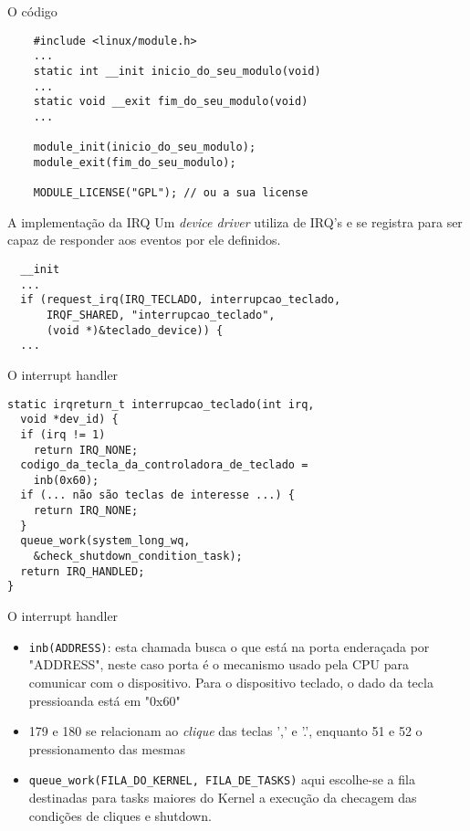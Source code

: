 \documentclass{beamer}
\begin{document}
\begin{frame}[fragile]{O código}
\begin{verbatim}
    #include <linux/module.h>
    ...
    static int __init inicio_do_seu_modulo(void) 
    ...
    static void __exit fim_do_seu_modulo(void)
    ...

    module_init(inicio_do_seu_modulo);
    module_exit(fim_do_seu_modulo);

    MODULE_LICENSE("GPL"); // ou a sua license
\end{verbatim}
\end{frame}

\begin{frame}[fragile]{A implementação da IRQ}
  Um \emph{device driver} utiliza de IRQ's e se registra para ser capaz de
  responder aos eventos por ele definidos.

\begin{verbatim}
  __init
  ...
  if (request_irq(IRQ_TECLADO, interrupcao_teclado, 
      IRQF_SHARED, "interrupcao_teclado", 
      (void *)&teclado_device)) {
  ...
\end{verbatim}
\end{frame}

\begin{frame}[fragile]{O interrupt handler}
\begin{verbatim}
static irqreturn_t interrupcao_teclado(int irq, 
  void *dev_id) {
  if (irq != 1)
    return IRQ_NONE;
  codigo_da_tecla_da_controladora_de_teclado = 
    inb(0x60);
  if (... não são teclas de interesse ...) {
    return IRQ_NONE;
  }
  queue_work(system_long_wq, 
    &check_shutdown_condition_task);
  return IRQ_HANDLED;
}
\end{verbatim}
\end{frame}

\begin{frame}{O interrupt handler}
  \begin{itemize}
    \item{\texttt{inb(ADDRESS)}: esta chamada busca o que está na porta
      enderaçada por "ADDRESS", neste caso porta é o mecanismo usado pela CPU
      para comunicar com o dispositivo. Para o dispositivo teclado, o dado da
      tecla pressioanda está em "0x60"}
    \item{179 e 180 se relacionam ao \emph{clique} das teclas ',' e '.',
      enquanto 51 e 52 o pressionamento das mesmas}
    \item{\texttt{queue\_work(FILA\_DO\_KERNEL, FILA\_DE\_TASKS)} aqui
      escolhe-se a fila destinadas para tasks maiores do Kernel a execução da
      checagem das condições de cliques e shutdown.}
  \end{itemize}
\end{frame}
\end{document}
